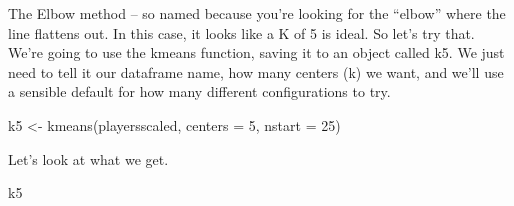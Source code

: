 \documentclass[
  letterpaper,
  DIV=11,
  numbers=noendperiod]{scrreprt}
\newenvironment{Shaded}{\begin{snugshade}}{\end{snugshade}}
\newcommand{\AttributeTok}[1]{\textcolor[rgb]{0.40,0.45,0.13}{#1}}
\newcommand{\DecValTok}[1]{\textcolor[rgb]{0.68,0.00,0.00}{#1}}
\newcommand{\FunctionTok}[1]{\textcolor[rgb]{0.28,0.35,0.67}{#1}}
\newcommand{\NormalTok}[1]{\textcolor[rgb]{0.00,0.23,0.31}{#1}}
\newcommand{\OtherTok}[1]{\textcolor[rgb]{0.00,0.23,0.31}{#1}}
\begin{document}
The Elbow method -- so named because you're looking for the ``elbow''
where the line flattens out. In this case, it looks like a K of 5 is
ideal. So let's try that. We're going to use the kmeans function, saving
it to an object called k5. We just need to tell it our dataframe name,
how many centers (k) we want, and we'll use a sensible default for how
many different configurations to try.

\begin{Shaded}
\begin{Highlighting}[]
\NormalTok{k5 }\OtherTok{\textless{}{-}} \FunctionTok{kmeans}\NormalTok{(playersscaled, }\AttributeTok{centers =} \DecValTok{5}\NormalTok{, }\AttributeTok{nstart =} \DecValTok{25}\NormalTok{)}
\end{Highlighting}
\end{Shaded}

Let's look at what we get.

\begin{Shaded}
\begin{Highlighting}[]
\NormalTok{k5}
\end{Highlighting}
\end{Shaded}
\end{document}
